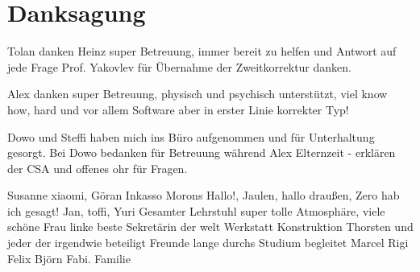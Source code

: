 \chapter{Danksagung}
Tolan danken
Heinz super Betreuung, immer bereit zu helfen und Antwort auf jede Frage
Prof. Yakovlev für Übernahme der Zweitkorrektur danken.

Alex danken super Betreuung, physisch und psychisch unterstützt, viel know how, hard und vor allem Software aber in erster Linie korrekter Typ!

Dowo und Steffi haben mich ins Büro aufgenommen und für Unterhaltung gesorgt. Bei Dowo bedanken für Betreuung während Alex Elternzeit - erklären der CSA und offenes ohr für Fragen.

Susanne xiaomi, Göran Inkasso Morons 
Hallo!, Jaulen, hallo draußen, Zero hab ich gesagt!
Jan, toffi, Yuri
Gesamter Lehrstuhl super tolle Atmosphäre, viele schöne 
Frau linke beste Sekretärin der welt
Werkstatt Konstruktion Thorsten und jeder der irgendwie beteiligt
Freunde lange durchs Studium begleitet Marcel Rigi Felix Björn Fabi.
Familie
